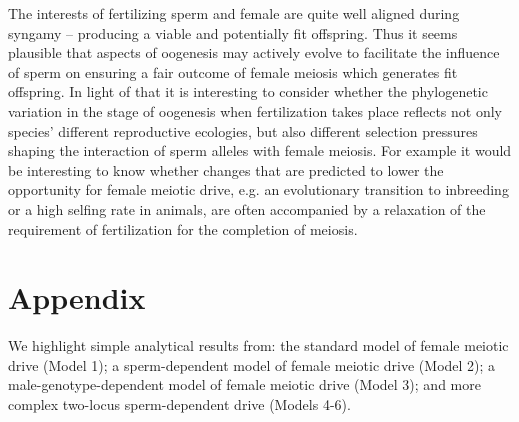 \documentclass[12pt,letterpaper]{article}
\newcommand{\yb}[1]{{ \color{blue} #1}}
\begin{document}
The interests of fertilizing sperm and female are quite well aligned during syngamy -- producing a viable and potentially fit offspring. 
Thus it seems plausible that aspects of oogenesis may actively evolve to facilitate the influence of sperm on ensuring a fair  outcome of female meiosis which generates fit offspring.
In light of that it is interesting to consider whether the phylogenetic variation in the stage of oogenesis when fertilization takes place reflects not
	only species' different reproductive ecologies, but also
        different selection pressures shaping the interaction of sperm
        alleles with female meiosis. 
For example it would be interesting to know whether changes that are predicted to lower the opportunity for female meiotic drive,
        e.g. an evolutionary transition to inbreeding or a high
        selfing rate in animals, are often accompanied by a relaxation of the requirement of fertilization for the completion of meiosis.




  \appendix


\section*{Appendix}
We highlight simple analytical results from: 
	the standard model of female meiotic drive (Model 1); a sperm-dependent 
	model of female meiotic drive (Model 2); a male-genotype-dependent model of
	female meiotic drive (Model 3); and more complex two-locus sperm-dependent drive (Models 4-6). %
\end{document}
